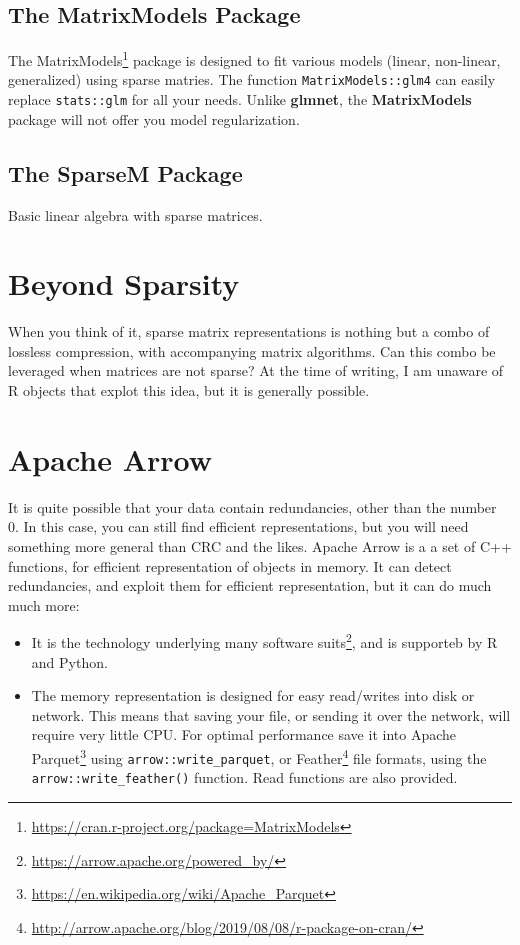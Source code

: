 \documentclass[]{book}
\providecommand{\tightlist}{%
  \setlength{\itemsep}{0pt}\setlength{\parskip}{0pt}}
\renewcommand{\href}[2]{#2\footnote{\url{#1}}}
\theoremstyle{definition}
\theoremstyle{definition}
\theoremstyle{definition}
\theoremstyle{remark}
\begin{document}
\hypertarget{the-matrixmodels-package}{%
\subsection{The MatrixModels Package}\label{the-matrixmodels-package}}

The \href{https://cran.r-project.org/package=MatrixModels}{MatrixModels} package is designed to fit various models (linear, non-linear, generalized) using sparse matries.
The function \texttt{MatrixModels::glm4} can easily replace \texttt{stats::glm} for all your needs.
Unlike \textbf{glmnet}, the \textbf{MatrixModels} package will not offer you model regularization.

\hypertarget{the-sparsem-package}{%
\subsection{The SparseM Package}\label{the-sparsem-package}}

Basic linear algebra with sparse matrices.

\hypertarget{beyond-sparsity}{%
\section{Beyond Sparsity}\label{beyond-sparsity}}

When you think of it, sparse matrix representations is nothing but a combo of lossless compression, with accompanying matrix algorithms.
Can this combo be leveraged when matrices are not sparse?
At the time of writing, I am unaware of R objects that explot this idea, but it is generally possible.

\hypertarget{apache-arrow}{%
\section{Apache Arrow}\label{apache-arrow}}

It is quite possible that your data contain redundancies, other than the number 0.
In this case, you can still find efficient representations, but you will need something more general than CRC and the likes.
Apache Arrow is a a set of C++ functions, for efficient representation of objects in memory.
It can detect redundancies, and exploit them for efficient representation, but it can do much much more:

\begin{itemize}
\tightlist
\item
  It is the technology underlying many \href{https://arrow.apache.org/powered_by/}{software suits}, and is supporteb by R and Python.
\item
  The memory representation is designed for easy read/writes into disk or network. This means that saving your file, or sending it over the network, will require very little CPU. For optimal performance save it into \href{https://en.wikipedia.org/wiki/Apache_Parquet}{Apache Parquet} using \texttt{arrow::write\_parquet}, or \href{http://arrow.apache.org/blog/2019/08/08/r-package-on-cran/}{Feather} file formats, using the \texttt{arrow::write\_feather()} function. Read functions are also provided.
\end{itemize}
\end{document}
